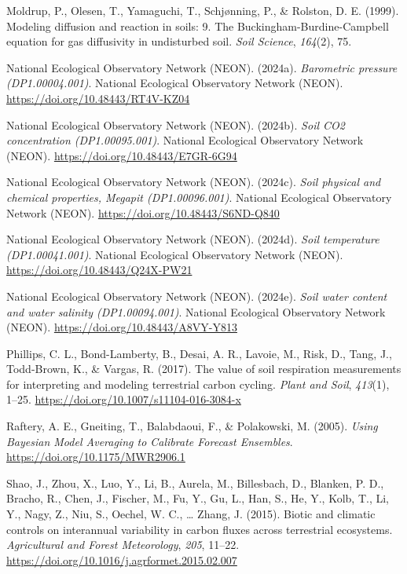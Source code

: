 \documentclass[
  letterpaper,
  DIV=11,
  numbers=noendperiod]{scrartcl}
\newlength{\cslhangindent}
\newenvironment{CSLReferences}[2] %
 {\begin{list}{}{%
  \setlength{\itemindent}{0pt}
  \setlength{\leftmargin}{0pt}
  \setlength{\parsep}{0pt}
  \ifodd #1
   \setlength{\leftmargin}{\cslhangindent}
   \setlength{\itemindent}{-1\cslhangindent}
  \fi
  \setlength{\itemsep}{#2\baselineskip}}}
 {\end{list}}
\begin{document}
\begin{CSLReferences}{1}{0}
Moldrup, P., Olesen, T., Yamaguchi, T., Schjønning, P., \& Rolston, D.
E. (1999). Modeling diffusion and reaction in soils: 9. {The
Buckingham-Burdine-Campbell} equation for gas diffusivity in undisturbed
soil. \emph{Soil Science}, \emph{164}(2), 75.

National Ecological Observatory Network (NEON). (2024a).
\emph{Barometric pressure ({DP1}.00004.001)}. National Ecological
Observatory Network (NEON). \url{https://doi.org/10.48443/RT4V-KZ04}

National Ecological Observatory Network (NEON). (2024b). \emph{Soil
{CO2} concentration ({DP1}.00095.001)}. National Ecological Observatory
Network (NEON). \url{https://doi.org/10.48443/E7GR-6G94}

National Ecological Observatory Network (NEON). (2024c). \emph{Soil
physical and chemical properties, {Megapit} ({DP1}.00096.001)}. National
Ecological Observatory Network (NEON).
\url{https://doi.org/10.48443/S6ND-Q840}

National Ecological Observatory Network (NEON). (2024d). \emph{Soil
temperature ({DP1}.00041.001)}. National Ecological Observatory Network
(NEON). \url{https://doi.org/10.48443/Q24X-PW21}

National Ecological Observatory Network (NEON). (2024e). \emph{Soil
water content and water salinity ({DP1}.00094.001)}. National Ecological
Observatory Network (NEON). \url{https://doi.org/10.48443/A8VY-Y813}

Phillips, C. L., Bond-Lamberty, B., Desai, A. R., Lavoie, M., Risk, D.,
Tang, J., Todd-Brown, K., \& Vargas, R. (2017). The value of soil
respiration measurements for interpreting and modeling terrestrial
carbon cycling. \emph{Plant and Soil}, \emph{413}(1), 1--25.
\url{https://doi.org/10.1007/s11104-016-3084-x}

Raftery, A. E., Gneiting, T., Balabdaoui, F., \& Polakowski, M. (2005).
\emph{Using {Bayesian Model Averaging} to {Calibrate Forecast
Ensembles}}. \url{https://doi.org/10.1175/MWR2906.1}

Shao, J., Zhou, X., Luo, Y., Li, B., Aurela, M., Billesbach, D.,
Blanken, P. D., Bracho, R., Chen, J., Fischer, M., Fu, Y., Gu, L., Han,
S., He, Y., Kolb, T., Li, Y., Nagy, Z., Niu, S., Oechel, W. C., \ldots{}
Zhang, J. (2015). Biotic and climatic controls on interannual
variability in carbon fluxes across terrestrial ecosystems.
\emph{Agricultural and Forest Meteorology}, \emph{205}, 11--22.
\url{https://doi.org/10.1016/j.agrformet.2015.02.007}


\end{CSLReferences}
\end{document}
